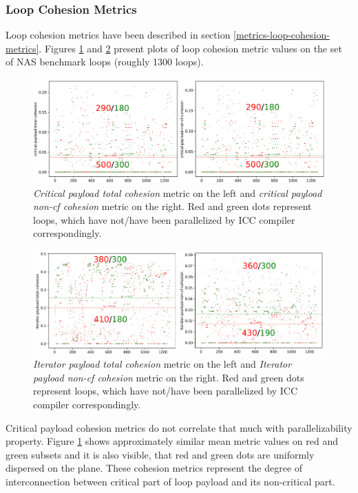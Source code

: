\subsubsection{Loop Cohesion Metrics}
\label{analysis-loop-cohesion-metrics}
\qquad Loop cohesion metrics have been described in section \ref{metrics-loop-cohesion-metrics}. Figures \ref{loop-cohesion-0} and \ref{loop-cohesion-1} present plots of loop cohesion metric values on the set of NAS benchmark loops (roughly 1300 loops).\newline    
\begin{figure}[h]
\centering
\includegraphics[width=\linewidth]{figs/loop-cohesion-0.png}
\caption{\textit{Critical payload total cohesion} metric on the left and \textit{critical payload non-cf cohesion} metric on the right. Red and green dots represent loops, which have not/have been parallelized by ICC compiler correspondingly.}
\label{loop-cohesion-0}
\end{figure}
\begin{figure}[h]
\centering
\includegraphics[width=\linewidth]{figs/loop-cohesion-1.png}
\caption{\textit{Iterator payload total cohesion} metric on the left and \textit{Iterator payload non-cf cohesion} metric on the right. Red and green dots represent loops, which have not/have been parallelized by ICC compiler correspondingly.}
\label{loop-cohesion-1}
\end{figure}
\qquad Critical payload cohesion metrics do not correlate that much with parallelizability property. Figure \ref{loop-cohesion-0} shows approximately similar mean metric values on red and green subsets and it is also visible, that red and green dots are uniformly dispersed on the plane. These cohesion metrics represent the degree of interconnection between critical part of loop payload and its non-critical part.\newline
